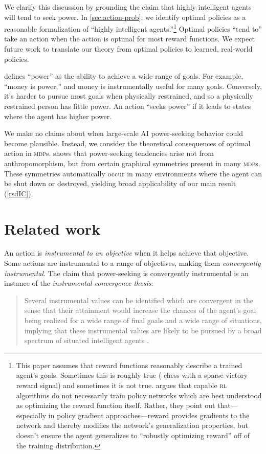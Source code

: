 \documentclass{article}
\newcommand*{\mdp}[1][m]{{\textsc{#1dp}}}
\newcommand*{\rl}[1][r]{{\textsc{#1l}}}
\theoremstyle{definition}
\begin{document}
We clarify this discussion by grounding the claim that highly intelligent agents will tend to seek power. In \cref{sec:action-prob}, we identify optimal policies as a reasonable formalization of ``highly intelligent agents.''\footnote{This paper assumes that reward functions reasonably describe a trained agent's goals. Sometimes this is roughly true (\eg{} chess with a sparse victory reward signal) and sometimes it is not true. \citet{rewardNotOpt} argues that capable {\rl} algorithms do not necessarily train policy networks which are best understood as optimizing the reward function itself. Rather, they point out that—especially in policy gradient approaches—reward provides gradients to the network and thereby modifies the network's generalization properties, but doesn't ensure the agent generalizes to ``robustly optimizing reward'' off of the training distribution.} Optimal policies ``tend to'' take an action when the action is optimal for most reward functions. We expect future work to translate our theory from optimal policies to learned, real-world policies. 

 defines ``power'' as the ability to achieve a wide range of goals. For example, ``money is power,'' and money is instrumentally useful for many goals. Conversely, it's harder to pursue most goals when physically restrained, and so a physically restrained person has little power. An action ``seeks power'' if it leads to states where the agent has higher power. 

We make no claims about when large-scale AI power-seeking behavior could become plausible. Instead, we consider the theoretical consequences of optimal action in {\mdp}s.  shows that power-seeking tendencies arise not from anthropomorphism, but from certain graphical symmetries present in many {\mdp}s. These symmetries automatically occur in many environments where the agent can be shut down or destroyed, yielding broad applicability of our main result (\cref{rsdIC}).


\section{Related work}\label{sec:prior}
An action is \emph{instrumental to an objective} when it helps achieve that objective. Some actions are instrumental to a range of objectives, making them \emph{convergently instrumental}. The claim that power-seeking is convergently instrumental is an instance of the \emph{instrumental convergence thesis}:
\begin{quote}
    Several instrumental values can be identified which are convergent in the sense that their attainment would increase the chances of the agent's goal being realized for a wide range of final goals and a wide range of situations, implying that these instrumental values are likely to be pursued by a broad spectrum of situated intelligent agents \citep{bostrom2012superintelligent}.
\end{quote}
\end{document}
